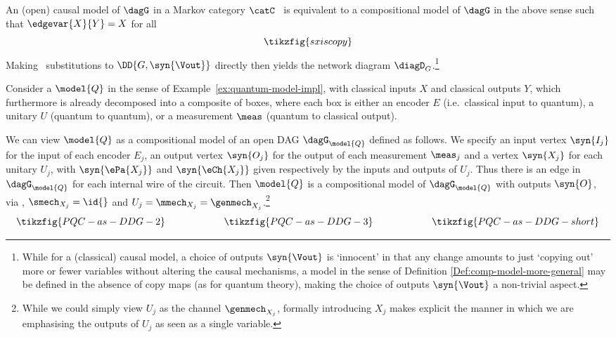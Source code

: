 \documentclass{article}
\begin{document}
\begin{example}
An (open) causal model of $\dagG$ in a Markov category $\catC$ \ is equivalent to a compositional model of $\dagG$ in the above sense such that $\edgevar{X}{Y} = X$ for all  
\[
\tikzfig{sxiscopy}
\]
Making \ substitutions to $\DD{G,\syn{\Vout}}$ directly then yields the network diagram $\diagD_G$.\footnote{While for a (classical) causal model, a choice of outputs $\syn{\Vout }$ is `innocent' in that any change amounts to just `copying out' more or fewer variables without altering the causal mechanisms, a model in the sense of Definition \ref{Def:comp-model-more-general} may be defined in the absence of copy maps (as for quantum theory), making the choice of outputs $\syn{\Vout}$ a non-trivial aspect.}
\end{example}


\begin{example} \label{ex:PQC-as-DDG} 

Consider a \qcircmodel{} $\model{Q}$ in the sense of Example~\ref{ex:quantum-model-impl}, with classical inputs $X$ and classical outputs $Y$, which furthermore is already decomposed into a composite of boxes, where each box is either an encoder $E$ (i.e.~classical input to quantum), a unitary $U$ (quantum to quantum), or a measurement $\meas$ (quantum to classical output). 

We can view $\model{Q}$ as a compositional model of an open DAG $\dagG_{\model{Q}}$ defined as follows.   
We specify an input vertex $\syn{I_j}$ for the input of each encoder $E_j$, an output vertex $\syn{O_j}$ for the output of each measurement $\meas_j$ and a vertex $\syn{X_j}$ for each unitary $U_j$, with $\syn{\ePa{X_j}}$ and $\syn{\eCh{X_j}}$ given respectively by the inputs and outputs of  $U_j$. Thus there is an edge in $\dagG_{\model{Q}}$ for each internal wire of the circuit. 
Then $\model{Q}$ is a compositional model of $\dagG_{\model{Q}}$ with outputs $\syn{O}$, via , $\smech_{X_j} = \id{}$ and $U_j = \mmech_{X_j} = \genmech_{X_j}$.\footnote{While we could simply view $U_j$ as the channel $\genmech_{X_j}$, formally introducing $X_j$ makes explicit the manner in which we are emphasising the outputs of $U_j$ as seen as a single variable.} 
\ 
\[
\tikzfig{PQC-as-DDG-2}
\qquad \qquad \qquad 
\tikzfig{PQC-as-DDG-3}
\qquad \qquad
\qquad
\tikzfig{PQC-as-DDG-short}
\]
\end{example}
\end{document}
